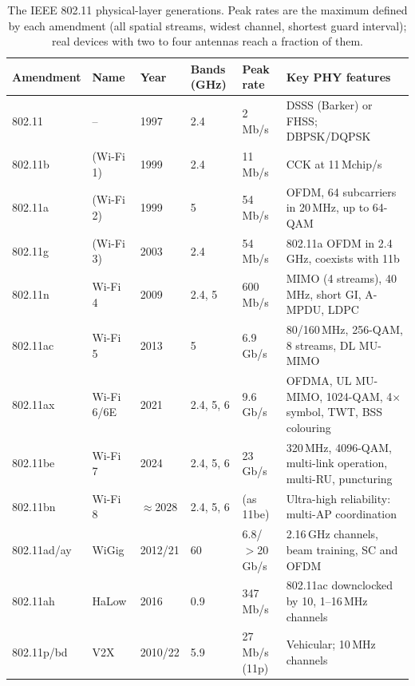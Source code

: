 \begin{table}[htbp]\centering\footnotesize
\caption{The IEEE 802.11 physical-layer generations. Peak rates are the maximum defined by each
amendment (all spatial streams, widest channel, shortest guard interval); real devices with two
to four antennas reach a fraction of them.}
\label{tab:ch22:generations}
\begin{tabularx}{\linewidth}{@{}l l l l l X@{}}
\toprule
Amendment & Name & Year & Bands (GHz) & Peak rate & Key PHY features\\
\midrule
802.11 & -- & 1997 & 2.4 & 2\,Mb/s & DSSS (Barker) or FHSS; DBPSK/DQPSK\\
802.11b & (Wi-Fi 1) & 1999 & 2.4 & 11\,Mb/s & CCK at 11\,Mchip/s\\
802.11a & (Wi-Fi 2) & 1999 & 5 & 54\,Mb/s & OFDM, 64 subcarriers in 20\,MHz, up to 64-QAM\\
802.11g & (Wi-Fi 3) & 2003 & 2.4 & 54\,Mb/s & 802.11a OFDM in 2.4\,GHz, coexists with 11b\\
802.11n & Wi-Fi 4 & 2009 & 2.4, 5 & 600\,Mb/s & MIMO (4 streams), 40\,MHz, short GI, A-MPDU, LDPC\\
802.11ac & Wi-Fi 5 & 2013 & 5 & 6.9\,Gb/s & 80/160\,MHz, 256-QAM, 8 streams, DL MU-MIMO\\
802.11ax & Wi-Fi 6/6E & 2021 & 2.4, 5, 6 & 9.6\,Gb/s & OFDMA, UL MU-MIMO, 1024-QAM, 4$\times$ symbol, TWT, BSS colouring\\
802.11be & Wi-Fi 7 & 2024 & 2.4, 5, 6 & 23\,Gb/s & 320\,MHz, 4096-QAM, multi-link operation, multi-RU, puncturing\\
802.11bn & Wi-Fi 8 & $\approx$2028 & 2.4, 5, 6 & (as 11be) & Ultra-high reliability: multi-AP coordination\\
\midrule
802.11ad/ay & WiGig & 2012/21 & 60 & 6.8/$>$20\,Gb/s & 2.16\,GHz channels, beam training, SC and OFDM\\
802.11ah & HaLow & 2016 & 0.9 & 347\,Mb/s & 802.11ac downclocked by 10, 1--16\,MHz channels\\
802.11p/bd & V2X & 2010/22 & 5.9 & 27\,Mb/s (11p) & Vehicular; 10\,MHz channels\\
\bottomrule
\end{tabularx}
\end{table}

